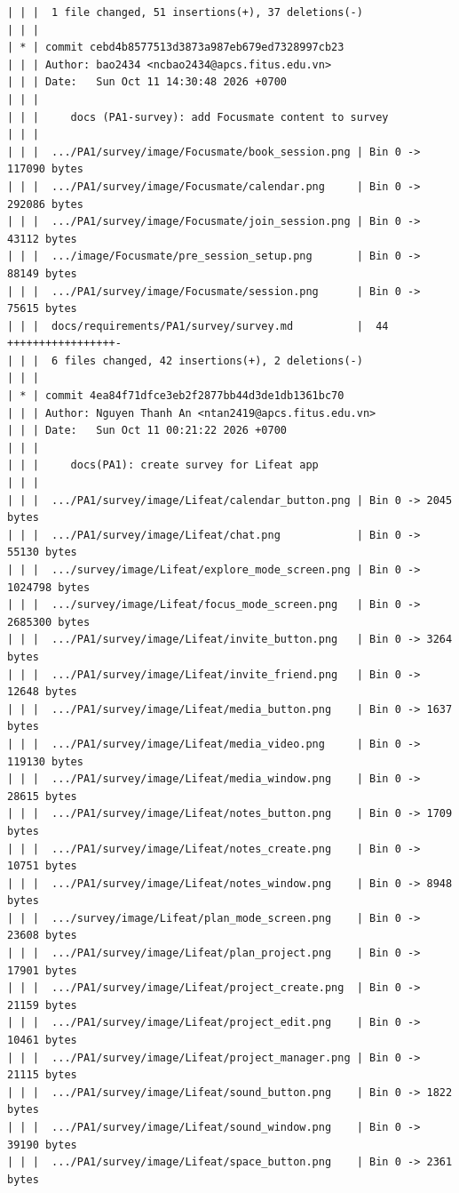 \documentclass[12pt]{article}
\begin{document}
\begin{lstlisting}[numbers=none,breaklines=true]
| | |  1 file changed, 51 insertions(+), 37 deletions(-)
| | |
| * | commit cebd4b8577513d3873a987eb679ed7328997cb23
| | | Author: bao2434 <ncbao2434@apcs.fitus.edu.vn>
| | | Date:   Sun Oct 11 14:30:48 2026 +0700
| | |
| | |     docs (PA1-survey): add Focusmate content to survey
| | |
| | |  .../PA1/survey/image/Focusmate/book_session.png | Bin 0 -> 117090 bytes
| | |  .../PA1/survey/image/Focusmate/calendar.png     | Bin 0 -> 292086 bytes
| | |  .../PA1/survey/image/Focusmate/join_session.png | Bin 0 -> 43112 bytes
| | |  .../image/Focusmate/pre_session_setup.png       | Bin 0 -> 88149 bytes
| | |  .../PA1/survey/image/Focusmate/session.png      | Bin 0 -> 75615 bytes
| | |  docs/requirements/PA1/survey/survey.md          |  44 +++++++++++++++++-
| | |  6 files changed, 42 insertions(+), 2 deletions(-)
| | |
| * | commit 4ea84f71dfce3eb2f2877bb44d3de1db1361bc70
| | | Author: Nguyen Thanh An <ntan2419@apcs.fitus.edu.vn>
| | | Date:   Sun Oct 11 00:21:22 2026 +0700
| | |
| | |     docs(PA1): create survey for Lifeat app
| | |
| | |  .../PA1/survey/image/Lifeat/calendar_button.png | Bin 0 -> 2045 bytes
| | |  .../PA1/survey/image/Lifeat/chat.png            | Bin 0 -> 55130 bytes
| | |  .../survey/image/Lifeat/explore_mode_screen.png | Bin 0 -> 1024798 bytes
| | |  .../survey/image/Lifeat/focus_mode_screen.png   | Bin 0 -> 2685300 bytes
| | |  .../PA1/survey/image/Lifeat/invite_button.png   | Bin 0 -> 3264 bytes
| | |  .../PA1/survey/image/Lifeat/invite_friend.png   | Bin 0 -> 12648 bytes
| | |  .../PA1/survey/image/Lifeat/media_button.png    | Bin 0 -> 1637 bytes
| | |  .../PA1/survey/image/Lifeat/media_video.png     | Bin 0 -> 119130 bytes
| | |  .../PA1/survey/image/Lifeat/media_window.png    | Bin 0 -> 28615 bytes
| | |  .../PA1/survey/image/Lifeat/notes_button.png    | Bin 0 -> 1709 bytes
| | |  .../PA1/survey/image/Lifeat/notes_create.png    | Bin 0 -> 10751 bytes
| | |  .../PA1/survey/image/Lifeat/notes_window.png    | Bin 0 -> 8948 bytes
| | |  .../survey/image/Lifeat/plan_mode_screen.png    | Bin 0 -> 23608 bytes
| | |  .../PA1/survey/image/Lifeat/plan_project.png    | Bin 0 -> 17901 bytes
| | |  .../PA1/survey/image/Lifeat/project_create.png  | Bin 0 -> 21159 bytes
| | |  .../PA1/survey/image/Lifeat/project_edit.png    | Bin 0 -> 10461 bytes
| | |  .../PA1/survey/image/Lifeat/project_manager.png | Bin 0 -> 21115 bytes
| | |  .../PA1/survey/image/Lifeat/sound_button.png    | Bin 0 -> 1822 bytes
| | |  .../PA1/survey/image/Lifeat/sound_window.png    | Bin 0 -> 39190 bytes
| | |  .../PA1/survey/image/Lifeat/space_button.png    | Bin 0 -> 2361 bytes

\end{lstlisting}
\end{document}
